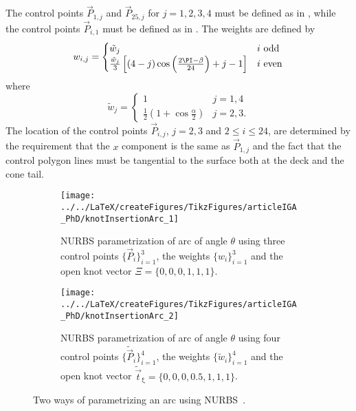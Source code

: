 The control points $\vec{P}_{1,j}$ and $\vec{P}_{25,j}$ for $j=1,2,3,4$ must be defined as in , while the control points $\vec{P}_{i,1}$ must be defined as in . The weights are defined by
\begin{equation*}
	w_{i,j} = \begin{cases}
		\tilde{w}_j & i\,\, \text{odd}\\
		\frac{\tilde{w}_j}{3}\left[(4-j)\cos\left(\frac{2\PI-\beta}{24}\right)+j-1\right] & i\,\, \text{even}
		\end{cases}		
\end{equation*}
where
\begin{equation*}
	\tilde{w}_j = \begin{cases}
		1 & j = 1,4\\
		\frac{1}{2}\left(1+\cos\frac{\alpha}{2}\right) & j = 2,3.
	\end{cases}
\end{equation*}
The location of the control points $\vec{P}_{i,j}$, $j=2,3$ and $2\leq i\leq 24$, are determined by the requirement that the $x$ component is the same as $\vec{P}_{1,j}$ and the fact that the control polygon lines must be tangential to the surface both at the deck and the cone tail.
\begin{figure}
	\centering    
	\begin{subfigure}{0.44\textwidth}
		\centering
		\texttt{[image: ../../LaTeX/createFigures/TikzFigures/articleIGA\_PhD/knotInsertionArc\_1]}
		\caption{NURBS parametrization of arc of angle $\theta$ using three control points $\{\vec{P}_i\}_{i=1}^3$, the weights $\{w_i\}_{i=1}^3$ and the open knot vector $\Xi=\{0,0,0,1,1,1\}$.}
		\label{Fig3:arcParam1}
	\end{subfigure}%
	\hspace*{0.02\textwidth}%
	\begin{subfigure}{0.54\textwidth}
		\centering
		\texttt{[image: ../../LaTeX/createFigures/TikzFigures/articleIGA\_PhD/knotInsertionArc\_2]}
		\caption{NURBS parametrization of arc of angle $\theta$ using four control points $\{\tilde{\vec{P}}_i\}_{i=1}^4$, the weights $\{\tilde{w}_i\}_{i=1}^4$ and the open knot vector $\tilde{\vec{t}}_\upxi=\{0,0,0,0.5,1,1,1\}$.}
		\label{Fig3:arcParam2}
	\end{subfigure}
	\caption{Two ways of parametrizing an arc using NURBS~\cite[p. 315]{Piegl1997tnb}.}
\end{figure}

